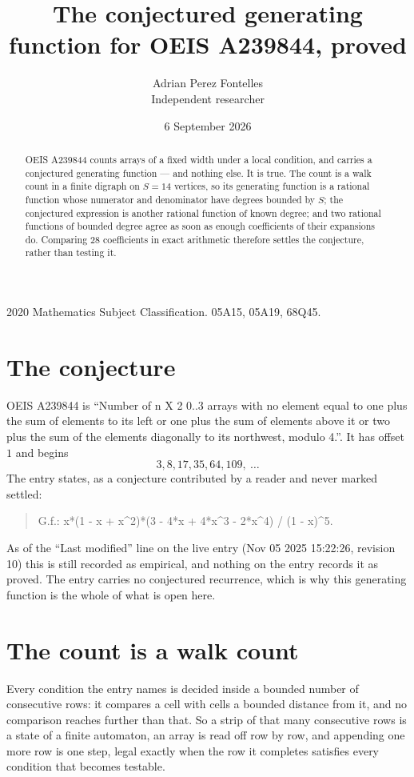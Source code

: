 \documentclass[11pt,a4paper]{article}
\title{The conjectured generating function for OEIS A239844, proved}
\author{Adrian Perez Fontelles\\ \small Independent researcher}
\date{6 September 2026}
\theoremstyle{plain}
\theoremstyle{definition}
\begin{document}
\maketitle

\begin{abstract}
OEIS A239844 counts arrays of a fixed width under a local condition, and carries a conjectured
generating function --- and nothing else. It is true. The count is a walk count in a finite
digraph on $S=14$ vertices, so its generating function is a rational function whose numerator
and denominator have degrees bounded by $S$; the conjectured expression is another rational
function of known degree; and two rational functions of bounded degree agree as soon as enough
coefficients of their expansions do. Comparing $28$ coefficients in exact arithmetic
therefore settles the conjecture, rather than testing it.
\end{abstract}

\noindent\small 2020 Mathematics Subject Classification. 05A15, 05A19, 68Q45.\normalsize

\section{The conjecture}

OEIS A239844 is ``Number of n X 2 0..3 arrays with no element equal to one plus the sum of elements to its left or one plus the sum of elements above it or two plus the sum of the elements diagonally to its northwest, modulo 4.''. It has offset $1$ and begins
\[
3, 8, 17, 35, 64, 109,\ \dots
\]
The entry states, as a conjecture contributed by a reader and never marked settled:
\begin{quote}
G.f.: x*(1 - x + x\^{}2)*(3 - 4*x + 4*x\^{}3 - 2*x\^{}4) / (1 - x)\^{}5.
\end{quote}
As of the ``Last modified'' line on the live entry (Nov 05 2025 15:22:26, revision 10) this is still
recorded as empirical, and nothing on the entry records it as proved. The entry carries no
conjectured recurrence, which is why this generating function is the whole of what is open
here.

\section{The count is a walk count}

Every condition the entry names is decided inside a bounded number of consecutive rows: it
compares a cell with cells a bounded distance from it, and no comparison reaches further than
that. So a strip of that many consecutive rows is a state of a finite automaton, an array is
read off row by row, and appending one more row is one step, legal exactly when the row it
completes satisfies every condition that becomes testable.
\end{document}
